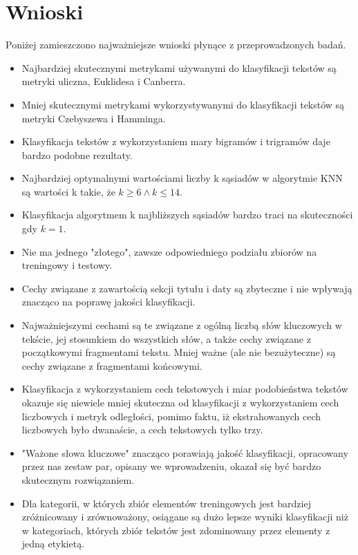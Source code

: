 \documentclass{classrep}
\begin{document}
\section{Wnioski}
Poniżej zamieszczono najważniejsze wnioski płynące z przeprowadzonych badań.
\begin{itemize}[label=$\bullet$\scshape\bfseries]
\item Najbardziej skutecznymi metrykami używanymi do klasyfikacji tekstów są metryki uliczna, Euklidesa i Canberra.
\item Mniej skutecznymi metrykami wykorzystywanymi do klasyfikacji tekstów są metryki Czebyszewa i Hamminga.
\item Klasyfikacja tekstów z wykorzystaniem mary bigramów i trigramów daje bardzo podobne rezultaty.
\item Najbardziej optymalnymi wartościami liczby k sąsiadów w algorytmie KNN są wartości k takie, że $k\geq6 \land k\leq14$.
\item Klasyfikacja algorytmem k najbliższych sąsiadów bardzo traci na skuteczności gdy $k=1$.
\item Nie ma jednego "złotego", zawsze odpowiedniego podziału zbiorów na treningowy i testowy.
\item Cechy związane z zawartością sekcji tytułu i daty są zbyteczne i nie wpływają znacząco na poprawę jakości klasyfikacji.
\item Najważniejszymi cechami są te związane z ogólną liczbą słów kluczowych w tekście, jej stosunkiem do wszystkich słów, a także cechy związane z początkowymi fragmentami tekstu. Mniej ważne (ale nie bezużyteczne) są cechy związane z fragmentami końcowymi.
\item Klasyfikacja z wykorzystaniem cech tekstowych i miar podobieństwa tekstów okazuje się niewiele mniej skuteczna od klasyfikacji z wykorzystaniem cech liczbowych i metryk odległości, pomimo faktu, iż ekstrahowanych cech liczbowych było dwanaście, a cech tekstowych tylko trzy.
\item "Ważone słowa kluczowe" znacząco porawiają jakość klasyfikacji, opracowany przez nas zestaw par, opisany we wprowadzeniu, okazał się być bardzo skutecznym rozwiązaniem.
\item Dla kategorii, w których zbiór elementów treningowych jest bardziej zróżnicowany i zrównoważony, osiągane są dużo lepsze wyniki klasyfikacji niż w kategoriach, których zbiór tekstów jest zdominowany przez elementy z jedną etykietą.
\end{itemize}
\end{document}
